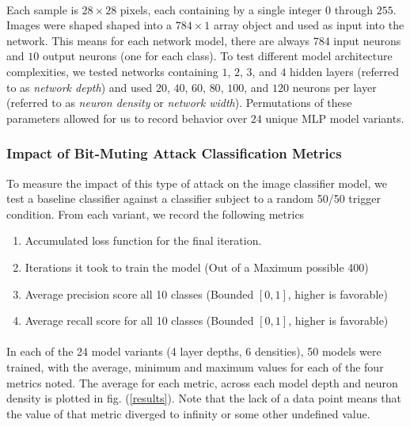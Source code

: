 \documentclass[12pt,letterpaper]{article}
\begin{document}
\paragraph*{}Each sample is $28 \times 28$ pixels, each containing by a single integer $0$ through $255$. Images were shaped shaped into a $784 \times 1$ array object and used as input into the network. This means for each network model, there are always $784$ input neurons and $10$ output neurons (one for each class). To test different model architecture complexities, we tested networks containing $1$, $2$, $3$, and $4$ hidden layers (referred to as \textit{network depth}) and used $20$, $40$, $60$, $80$, $100$, and $120$ neurons per layer (referred to as \textit{neuron density} or \textit{network width}). Permutations of these parameters allowed for us to record behavior over $24$ unique MLP model variants.

\subsubsection{Impact of Bit-Muting Attack Classification Metrics}

To measure the impact of this type of attack on the image classifier model, we test a baseline classifier against a classifier subject to a random 50/50 trigger condition. From each variant, we record the following metrics

\begin{enumerate}
\item Accumulated loss function for the final iteration.
\item Iterations it took to train the model (Out of a Maximum possible 400)
\item Average precision score all 10 classes (Bounded $[0,1]$, higher is favorable)
\item Average recall score for all 10 classes (Bounded $[0,1]$, higher is favorable)
\end{enumerate} 

\paragraph*{}In each of the 24 model variants (4 layer depths, 6 densities), 50 models were trained, with the average, minimum and maximum values for each of the four metrics noted. The average for each metric, across each model depth and neuron density is plotted in fig. (\ref{results}). Note that the lack of a data point means that the value of that metric diverged to infinity or some other undefined value.
\end{document}

